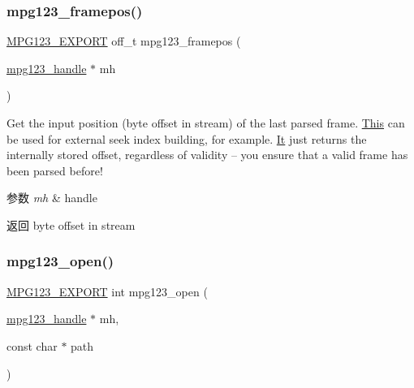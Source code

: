 \subsubsection{\texorpdfstring{mpg123\+\_\+framepos()}{mpg123\_framepos()}}
{\footnotesize\ttfamily \hyperlink{mpg123_8h_a2ba98cfba3f760879df70e755b2a61cc}{M\+P\+G123\+\_\+\+E\+X\+P\+O\+RT} off\+\_\+t mpg123\+\_\+framepos (\begin{DoxyParamCaption}\item[{\hyperlink{group__mpg123__init_ga6728e2839a395f3a07d4514da659faca}{mpg123\+\_\+handle} $\ast$}]{mh }\end{DoxyParamCaption})}

Get the input position (byte offset in stream) of the last parsed frame. \hyperlink{namespace_this}{This} can be used for external seek index building, for example. \hyperlink{class_it}{It} just returns the internally stored offset, regardless of validity -- you ensure that a valid frame has been parsed before! 
\begin{DoxyParams}{参数}
{\em mh} & handle \\
\hline
\end{DoxyParams}
\begin{DoxyReturn}{返回}
byte offset in stream 
\end{DoxyReturn}
\mbox{\label{group__mpg123__input_ga8f74d35cf61667a791b507c76c22a29b}} 
\subsubsection{\texorpdfstring{mpg123\+\_\+open()}{mpg123\_open()}}
{\footnotesize\ttfamily \hyperlink{mpg123_8h_a2ba98cfba3f760879df70e755b2a61cc}{M\+P\+G123\+\_\+\+E\+X\+P\+O\+RT} int mpg123\+\_\+open (\begin{DoxyParamCaption}\item[{\hyperlink{group__mpg123__init_ga6728e2839a395f3a07d4514da659faca}{mpg123\+\_\+handle} $\ast$}]{mh,  }\item[{const char $\ast$}]{path }\end{DoxyParamCaption})}

